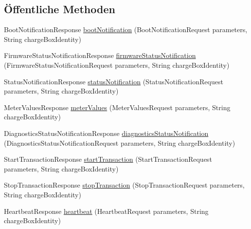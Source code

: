 \subsection*{Öffentliche Methoden}
\begin{DoxyCompactItemize}
\item 
Boot\-Notification\-Response \hyperlink{classde_1_1rwth_1_1idsg_1_1steve_1_1ocpp_1_1soap_1_1_central_system_service12___soap_server_a8868c4202a11c5e037e027cf888d9a6d}{boot\-Notification} (Boot\-Notification\-Request parameters, String charge\-Box\-Identity)
\item 
Firmware\-Status\-Notification\-Response \hyperlink{classde_1_1rwth_1_1idsg_1_1steve_1_1ocpp_1_1soap_1_1_central_system_service12___soap_server_af25e1106361138e2aac99d5d17d7e34d}{firmware\-Status\-Notification} (Firmware\-Status\-Notification\-Request parameters, String charge\-Box\-Identity)
\item 
Status\-Notification\-Response \hyperlink{classde_1_1rwth_1_1idsg_1_1steve_1_1ocpp_1_1soap_1_1_central_system_service12___soap_server_a1aa28896be7a93171ac1ce02f9102de3}{status\-Notification} (Status\-Notification\-Request parameters, String charge\-Box\-Identity)
\item 
Meter\-Values\-Response \hyperlink{classde_1_1rwth_1_1idsg_1_1steve_1_1ocpp_1_1soap_1_1_central_system_service12___soap_server_a79ee3a7402a8600396c3c3756a66d93b}{meter\-Values} (Meter\-Values\-Request parameters, String charge\-Box\-Identity)
\item 
Diagnostics\-Status\-Notification\-Response \hyperlink{classde_1_1rwth_1_1idsg_1_1steve_1_1ocpp_1_1soap_1_1_central_system_service12___soap_server_a4ea6f4e5412ba378a9ff8c13a74fc789}{diagnostics\-Status\-Notification} (Diagnostics\-Status\-Notification\-Request parameters, String charge\-Box\-Identity)
\item 
Start\-Transaction\-Response \hyperlink{classde_1_1rwth_1_1idsg_1_1steve_1_1ocpp_1_1soap_1_1_central_system_service12___soap_server_aaab901ffdf38c2b084ab9e0f6fd9981b}{start\-Transaction} (Start\-Transaction\-Request parameters, String charge\-Box\-Identity)
\item 
Stop\-Transaction\-Response \hyperlink{classde_1_1rwth_1_1idsg_1_1steve_1_1ocpp_1_1soap_1_1_central_system_service12___soap_server_a5530dbecf1921ebae73c136a59f630d3}{stop\-Transaction} (Stop\-Transaction\-Request parameters, String charge\-Box\-Identity)
\item 
Heartbeat\-Response \hyperlink{classde_1_1rwth_1_1idsg_1_1steve_1_1ocpp_1_1soap_1_1_central_system_service12___soap_server_a2217bc63cfc14a6f413aac32f5776a2e}{heartbeat} (Heartbeat\-Request parameters, String charge\-Box\-Identity)

\end{DoxyCompactItemize}
